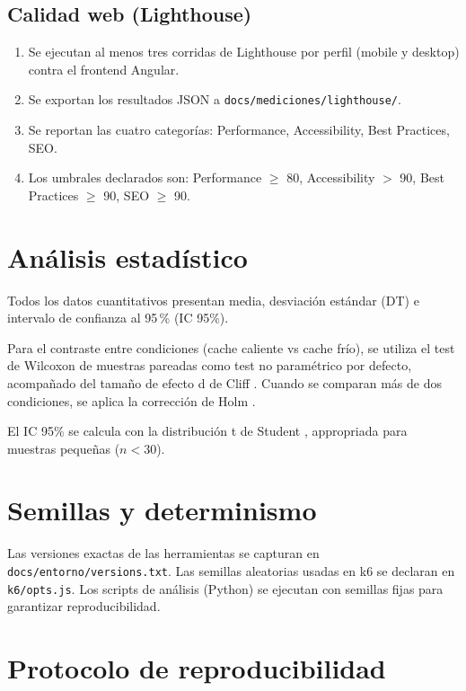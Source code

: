\subsection{Calidad web (Lighthouse)}

\begin{enumerate}
  \item Se ejecutan al menos tres corridas de Lighthouse por perfil (mobile y desktop) contra el frontend Angular.
  \item Se exportan los resultados JSON a \texttt{docs/mediciones/lighthouse/}.
  \item Se reportan las cuatro categorías: Performance, Accessibility, Best Practices, SEO.
  \item Los umbrales declarados son: Performance $\geq$ 80, Accessibility $>$ 90, Best Practices $\geq$ 90, SEO $\geq$ 90.
\end{enumerate}

\section{Análisis estadístico}
\label{sec:estadistica}

Todos los datos cuantitativos presentan media, desviación estándar (DT) e intervalo de confianza al 95\,\% (IC 95\%).

Para el contraste entre condiciones (cache caliente vs cache frío), se utiliza el test de Wilcoxon de muestras pareadas \cite{wilcoxon1945} como test no paramétrico por defecto, acompañado del tamaño de efecto d de Cliff \cite{cliff1993}. Cuando se comparan más de dos condiciones, se aplica la corrección de Holm \cite{wohlin2012}.

El IC 95\% se calcula con la distribución t de Student \cite{student1908}, appropriada para muestras pequeñas ($n < 30$).

\section{Semillas y determinismo}
\label{sec:semillas}

Las versiones exactas de las herramientas se capturan en \texttt{docs/entorno/versions.txt}. Las semillas aleatorias usadas en k6 se declaran en \texttt{k6/opts.js}. Los scripts de análisis (Python) se ejecutan con semillas fijas para garantizar reproducibilidad.

\section{Protocolo de reproducibilidad}
\label{sec:reproducibilidad}

